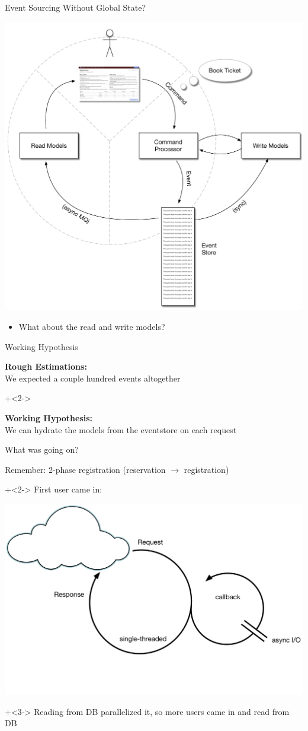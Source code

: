 \begin{frame}[fragile]{Event Sourcing Without Global State?}

\includegraphics[width=.5\textwidth]{../EventSourcing4.pdf}

\begin{itemize}
\item What about the read and write models?
\end{itemize}

\end{frame}

\begin{frame}[fragile]{Working Hypothesis}

\textbf{Rough Estimations:} \\[.7em]
We expected a couple hundred events altogether

\onslide+<2->
\vspace{5em}

\textbf{Working Hypothesis:} \\[.7em]
We can hydrate the models from the eventstore on each request

\end{frame}


\begin{frame}[fragile]{What was going on?}

\renewcommand{\SPACE}{.6em}

Remember: 2-phase registration (reservation $\rightarrow$ registration)
\vspace{\SPACE}

\onslide+<2->
First user came in:
\vspace{\SPACE}

\includegraphics[width=.5\textwidth]{../Nodejs3.pdf}

\onslide+<3->
Reading from DB parallelized it, so more users came in and read from DB

\end{frame}

